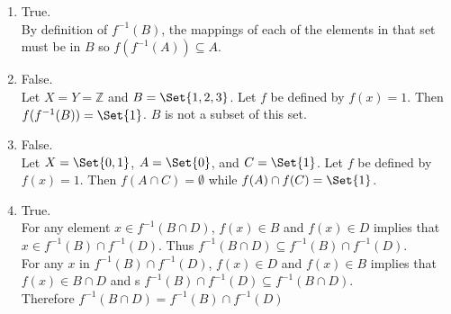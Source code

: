 \documentclass[paper=a4, fontsize=11pt]{jhwhw} %
\begin{document}
\begin{enumerate}
    \item True.\\
        By definition of $f^{-1}(B)$, the mappings of each of the elements in that set must be in $B$ so $f(f^{-1}(A)) \subseteq A$. 
    \item False.\\
        Let $X = Y = \mathbb Z$ and $B = \Set{1, 2, 3}$. Let $f$ be defined by $f(x) = 1$. Then $f(f^{-1}(B)) = \Set{1}$. $B$ is not a subset of this set. 
    \item False.\\
         Let $X = \Set{0, 1}$, $A = \Set{0}$, and $C = \Set{1}$. Let $f$ be defined by $f(x) = 1$. Then $f(A\cap C) = \emptyset$ while $f(A)\cap f(C) = \Set{1}$.
    \item True.\\
         For any element $x\in f^{-1}(B\cap D)$, $f(x)\in B$ and $f(x)\in D$ implies that $x\in f^{-1}(B)\cap f^{-1}(D)$. Thus $f^{-1}(B\cap D) \subseteq f^{-1}(B)\cap f^{-1}(D)$. \\

        For any $x$ in $f^{-1}(B)\cap f^{-1}(D)$, $f(x)\in D$ and $f(x)\in B$ implies that $f(x)\in B\cap D$ and s $f^{-1}(B)\cap f^{-1}(D) \subseteq f^{-1}(B\cap D)$. \\

        Therefore $f^{-1}(B\cap D) = f^{-1}(B) \cap f^{-1}(D)$
\end{enumerate}
\end{document}
